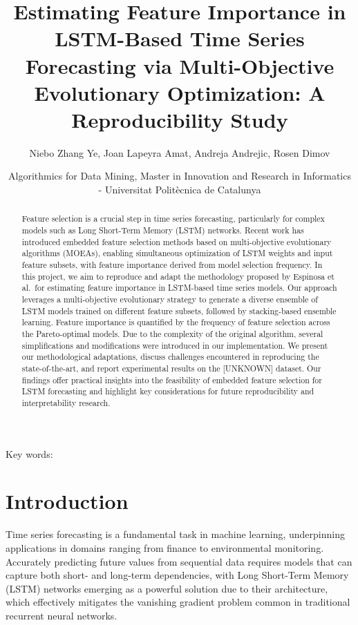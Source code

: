 \documentclass[12pt]{article}
\title{Estimating Feature Importance in LSTM-Based Time Series Forecasting via Multi-Objective Evolutionary Optimization: A Reproducibility Study}
\author{Niebo Zhang Ye, Joan Lapeyra Amat, Andreja Andrejic, Rosen Dimov}
\date{Algorithmics for Data Mining, Master in Innovation and Research in Informatics - Universitat Politècnica de Catalunya }
\begin{document}
\maketitle

\makenomenclature
\maketitle

\begin{abstract}
Feature selection is a crucial step in time series forecasting, particularly for complex models such as Long Short-Term Memory (LSTM) networks. Recent work has introduced embedded feature selection methods based on multi-objective evolutionary algorithms (MOEAs), enabling simultaneous optimization of LSTM weights and input feature subsets, with feature importance derived from model selection frequency. In this project, we aim to reproduce and adapt the methodology proposed by Espinosa et al.\ for estimating feature importance in LSTM-based time series models. Our approach leverages a multi-objective evolutionary strategy to generate a diverse ensemble of LSTM models trained on different feature subsets, followed by stacking-based ensemble learning. Feature importance is quantified by the frequency of feature selection across the Pareto-optimal models. Due to the complexity of the original algorithm, several simplifications and modifications were introduced in our implementation. We present our methodological adaptations, discuss challenges encountered in reproducing the state-of-the-art, and report experimental results on the [UNKNOWN] dataset. Our findings offer practical insights into the feasibility of embedded feature selection for LSTM forecasting and highlight key considerations for future reproducibility and interpretability research.
\end{abstract}

\begin{flushleft}
\end{flushleft}

\begin{flushleft}
Key words:\textbf{ }
\end{flushleft}

\printnomenclature

\section{Introduction}

Time series forecasting is a fundamental task in machine learning, underpinning applications in domains ranging from finance to environmental monitoring. Accurately predicting future values from sequential data requires models that can capture both short- and long-term dependencies, with Long Short-Term Memory (LSTM) networks emerging as a powerful solution due to their architecture, which effectively mitigates the vanishing gradient problem common in traditional recurrent neural networks.
\end{document}

